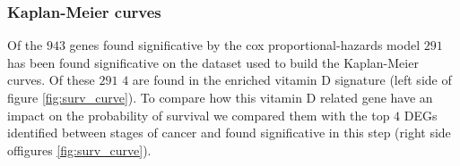 \documentclass[fleqn,10pt]{SelfArx} %
\begin{document}
		\subsubsection{Kaplan-Meier curves}
		Of the $943$ genes found significative by the cox proportional-hazards model $291$ has been found significative on the dataset used to build the Kaplan-Meier curves.
		Of these $291$ $4$ are found in the enriched vitamin D signature (left side of figure \ref{fig:surv_curve}).
		To compare how this vitamin D related gene have an impact on the probability of survival we compared them with the top $4$ DEGs identified between stages of cancer and found significative in this step (right side offigures \ref{fig:surv_curve}).

		 \begin{figure}[ht]\centering
			 \begin{multicols}{2}


\end{multicols}
\end{figure}
\end{document}
